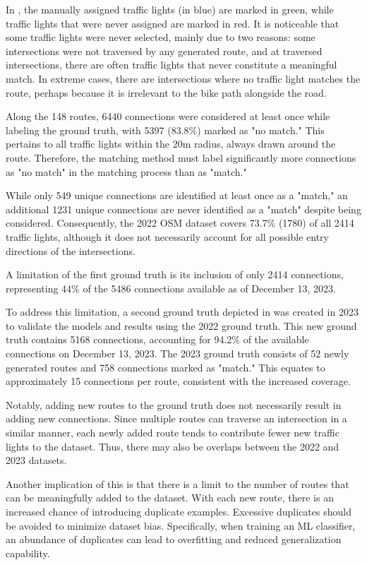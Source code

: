 In , the manually assigned traffic lights (in blue) are marked in green, while traffic lights that were never assigned are marked in red. It is noticeable that some traffic lights were never selected, mainly due to two reasons: some intersections were not traversed by any generated route, and at traversed intersections, there are often traffic lights that never constitute a meaningful match. In extreme cases, there are intersections where no traffic light matches the route, perhaps because it is irrelevant to the bike path alongside the road.

Along the 148 routes, 6440 connections were considered at least once while labeling the ground truth, with 5397 (83.8\%) marked as "no match." This pertains to all traffic lights within the 20m radius, always drawn around the route. Therefore, the matching method must label significantly more connections as "no match" in the matching process than as "match."

While only 549 unique connections are identified at least once as a "match," an additional 1231 unique connections are never identified as a "match" despite being considered. Consequently, the 2022 OSM dataset covers 73.7\% (1780) of all 2414 traffic lights, although it does not necessarily account for all possible entry directions of the intersections.

A limitation of the first ground truth is its inclusion of only 2414 connections, representing 44\% of the 5486 connections available as of December 13, 2023.

To address this limitation, a second ground truth depicted in  was created in 2023 to validate the models and results using the 2022 ground truth. This new ground truth contains 5168 connections, accounting for 94.2\% of the available connections on December 13, 2023. The 2023 ground truth consists of 52 newly generated routes and 758 connections marked as "match." This equates to approximately 15 connections per route, consistent with the increased coverage.

Notably, adding new routes to the ground truth does not necessarily result in adding new connections. Since multiple routes can traverse an intersection in a similar manner, each newly added route tends to contribute fewer new traffic lights to the dataset. Thus, there may also be overlaps between the 2022 and 2023 datasets.

Another implication of this is that there is a limit to the number of routes that can be meaningfully added to the dataset. With each new route, there is an increased chance of introducing duplicate examples. Excessive duplicates should be avoided to minimize dataset bias. Specifically, when training an ML classifier, an abundance of duplicates can lead to overfitting and reduced generalization capability.

